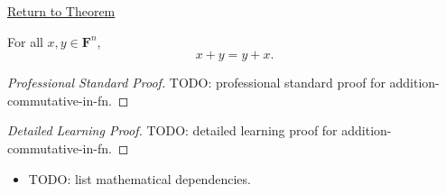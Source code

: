 \newpage
{}
\label{prf:addition-commutative-in-fn}

\begin{remark*}[Return]
\hyperref[thm:addition-commutative-in-fn]{Return to Theorem}
\end{remark*}

\begin{theorem*}
For all $x,y \in \mathbf{F}^n$,
\[
x+y=y+x.
\]
\end{theorem*}

\begin{proof}[Professional Standard Proof]
\LRAProofBodyStart
TODO: professional standard proof for addition-commutative-in-fn.
\end{proof}

\begin{proof}[Detailed Learning Proof]
\LRAProofBodyStart
TODO: detailed learning proof for addition-commutative-in-fn.
\end{proof}

\begin{remark*}
\end{remark*}

\begin{dependencies}
\begin{itemize}
  \item TODO: list mathematical dependencies.
\end{itemize}
\end{dependencies}

\clearpage
